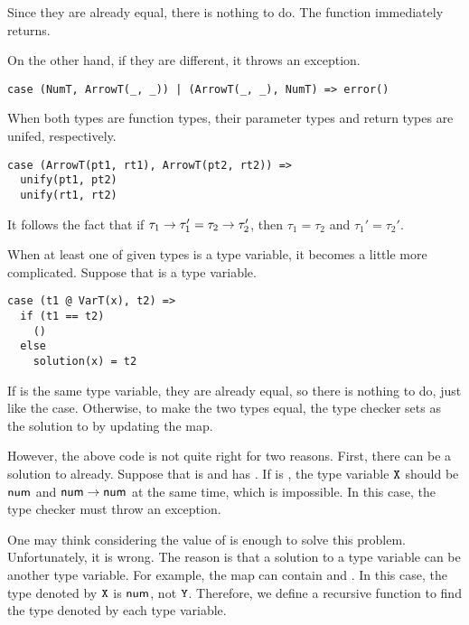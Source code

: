 Since they are already equal, there is nothing to do. The function immediately
returns.

On the other hand, if they are different, it throws an exception.

\begin{verbatim}
case (NumT, ArrowT(_, _)) | (ArrowT(_, _), NumT) => error()
\end{verbatim}

When both types are function types, their parameter types and return types are
unifed, respectively.

\begin{verbatim}
case (ArrowT(pt1, rt1), ArrowT(pt2, rt2)) =>
  unify(pt1, pt2)
  unify(rt1, rt2)
\end{verbatim}

It follows the fact that if $\tau_1\rightarrow\tau_1'=\tau_2\rightarrow\tau_2'$,
then $\tau_1=\tau_2$ and $\tau_1'=\tau_2'$.

When at least one of given types is a type variable, it becomes a little more
complicated. Suppose that  is a type variable.

\begin{verbatim}
case (t1 @ VarT(x), t2) =>
  if (t1 == t2)
    ()
  else
    solution(x) = t2
\end{verbatim}

If  is the same type variable, they are already equal, so there is
nothing to do, just like the  case. Otherwise, to make the
two types equal, the type checker sets  as the solution to  by
updating the  map.

However, the above code is not quite right for two reasons. First, there can be
a solution to  already. Suppose that  is  and
 has . If  is , the type variable $\texttt{X}$ should be $\textsf{num}$ and $\textsf{num}\rightarrow\textsf{num}$ at
the same time, which is impossible. In this case, the type checker must throw
an exception.

One may think considering the value of  is enough to
solve this problem. Unfortunately, it is wrong. The reason is that a solution to
a type variable can be another type variable. For example, the map can contain
 and . In this case, the type denoted
by $\texttt{X}$ is $\textsf{num}$, not $\texttt{Y}$. Therefore, we define a recursive function to
find the type denoted by each type variable.

